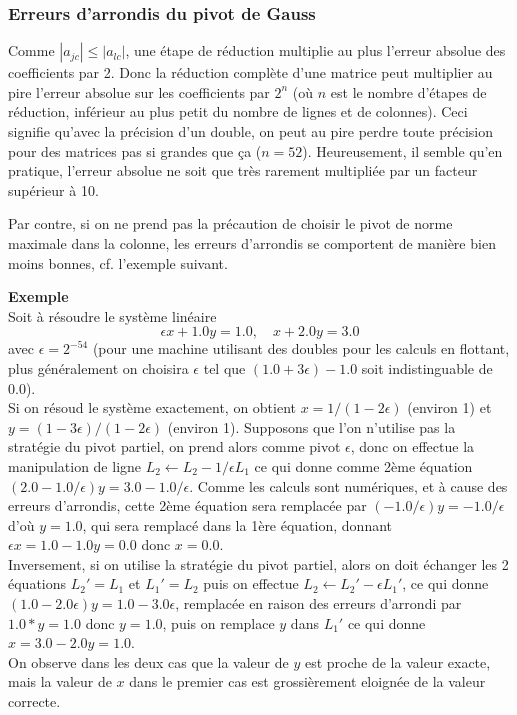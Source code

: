 \documentclass[a4paper,11pt]{article}
\begin{document}
\subsubsection{Erreurs d'arrondis du pivot de Gauss} 
Comme $|a_{jc}| \leq |a_{lc}|$, une étape de réduction multiplie
au plus l'erreur absolue des coefficients par 2. Donc la
réduction complète d'une matrice peut multiplier au pire l'erreur
absolue sur les coefficients par $2^n$ (où $n$ est le nombre
d'étapes de réduction, inférieur au plus petit du nombre de lignes
et de colonnes). Ceci signifie qu'avec la précision d'un double,
on peut au pire perdre toute précision pour des matrices pas
si grandes que ça ($n=52$). Heureusement, il semble qu'en pratique, 
l'erreur absolue
ne soit que très rarement multipliée par un facteur supérieur à 10.

Par contre, si on ne prend pas la précaution de choisir le pivot
de norme maximale dans la colonne, les erreurs d'arrondis se
comportent de manière bien moins bonnes, cf. l'exemple suivant.

{\bf Exemple}\\
Soit \`a r\'esoudre le syst\`eme lin\'eaire
\[ \epsilon x + 1.0 y = 1.0 , \quad x + 2.0 y = 3.0 \]
avec $\epsilon =2^{-54}$ (pour une machine utilisant des doubles pour
les calculs en flottant,
plus g\'en\'eralement on choisira $\epsilon$ tel que $(1.0+3\epsilon)-1.0$
soit indistinguable de 0.0).\\
Si on r\'esoud le syst\`eme exactement,
on obtient $x=1/(1-2\epsilon)$ (environ 1)
et $y=(1-3\epsilon)/(1-2\epsilon)$ (environ 1).
Supposons que l'on n'utilise pas la strat\'egie du pivot partiel,
on prend alors comme pivot $\epsilon$, donc on effectue la
manipulation de ligne $L_2 \leftarrow L_2 - 1/\epsilon L_1$ ce qui
donne comme 2\`eme \'equation $(2.0-1.0/\epsilon)y=3.0-1.0/\epsilon$.
Comme les calculs sont num\'eriques, et \`a cause des erreurs
d'arrondis, cette 2\`eme \'equation sera remplac\'ee par
$(-1.0/\epsilon)y=-1.0/\epsilon$ d'o\`u $y=1.0$, qui sera remplac\'e
dans la 1\`ere \'equation, donnant $\epsilon x = 1.0-1.0y=0.0$ donc
$x=0.0$.\\
Inversement, si on utilise la strat\'egie du pivot partiel, alors
on doit \'echanger les 2 \'equations $L_2'=L_1$ et $L_1'=L_2$ puis on effectue
$L_2 \leftarrow L_2' - \epsilon L_1'$, ce qui donne
$(1.0-2.0\epsilon) y = 1.0 - 3.0 \epsilon $, remplac\'ee en raison
des erreurs d'arrondi par $1.0*y=1.0$ donc $y=1.0$, puis on remplace
$y$ dans $L_1'$ ce qui donne $x=3.0-2.0y=1.0$.\\
On observe dans les deux cas que la valeur de $y$ est proche de la
valeur exacte, mais la valeur de $x$ dans le premier cas est
grossi\`erement eloign\'ee de la valeur correcte.
\end{document}
